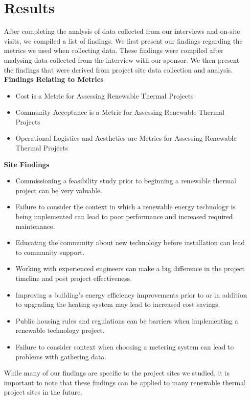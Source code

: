 \section*{Results}
\par After completing the analysis of data collected from our interviews and on-site visits, we compiled a list of findings. We first present our findings regarding the metrics we used when collecting data. These findings were compiled after analysing data collected from the interview with our sponsor. We then present the findings that were derived from project site data collection and analysis.\\

\noindent
\textbf{Findings Relating to Metrics}
\begin{itemize}
  \item{Cost is a Metric for Assessing Renewable Thermal Projects}
  \item{Community Acceptance is a Metric for Assessing Renewable Thermal Projects}
  \item{Operational Logistics and Aesthetics are Metrics for Assessing Renewable Thermal Projects}
\end{itemize}

\noindent
\textbf{Site Findings}
\begin{itemize}
  \item{Commissioning a feasibility study prior to beginning a renewable thermal project can be very valuable.}
  \item{Failure to consider the context in which a renewable energy technology is being implemented can lead to poor performance and increased required maintenance.}
  \item{Educating the community about new technology before installation can lead to community support.}
  \item{Working with experienced engineers can make a big difference in the project timeline and post project effectiveness.}
  \item{Improving a building's energy efficiency improvements prior to or in addition to upgrading the heating system may lead to increased cost savings.}
  \item{Public housing rules and regulations can be barriers when implementing a renewable technology project.}
  \item{Failure to consider context when choosing a metering system can lead to problems with gathering data.}
\end{itemize}
\par While many of our findings are specific to the project sites we studied, it is important to note that these findings can be applied to many renewable thermal project sites in the future.

